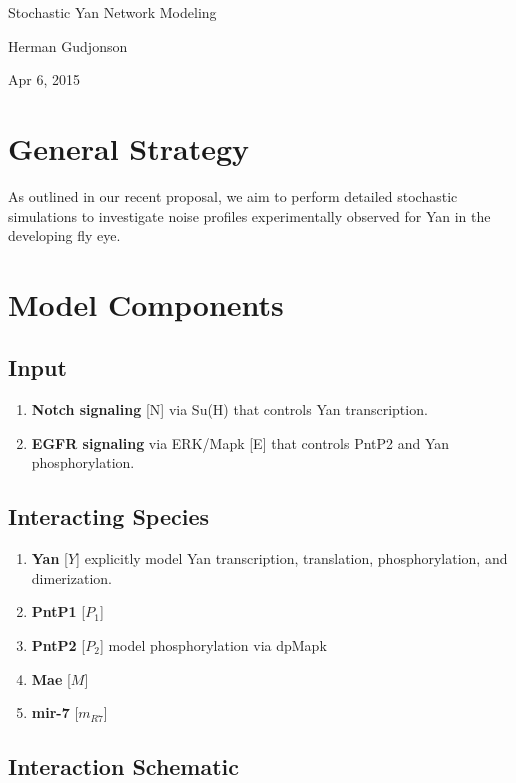 \documentclass[12pt]{article}
\renewcommand{\(}{\left(}
\renewcommand{\)}{\right)}
\begin{document}
\begin{center}
{\large Stochastic Yan Network Modeling}

Herman Gudjonson

Apr 6, 2015
\end{center}

\section{General Strategy}

As outlined in our recent proposal, we aim to perform detailed stochastic  simulations to investigate noise profiles experimentally observed for Yan in the developing fly eye. 

\section{Model Components}

\subsection{Input}
	\begin{enumerate}
	\item \textbf{Notch signaling} [N] via Su(H) that controls Yan transcription. 
	\item \textbf{EGFR signaling} via ERK/Mapk [E] that controls PntP2 and Yan phosphorylation. 
	\end{enumerate}

\subsection{Interacting Species}
	\begin{enumerate}
	\item \textbf{Yan} [$Y$] explicitly model Yan transcription, translation, phosphorylation, and dimerization.
	\item \textbf{PntP1} [$P_1$]
	\item \textbf{PntP2} [$P_2$] model phosphorylation via dpMapk
	\item \textbf{Mae} [$M$]
	\item \textbf{mir-7} [$m_{R7}$]
	\end{enumerate}
	
\subsection{Interaction Schematic}
\end{document}
